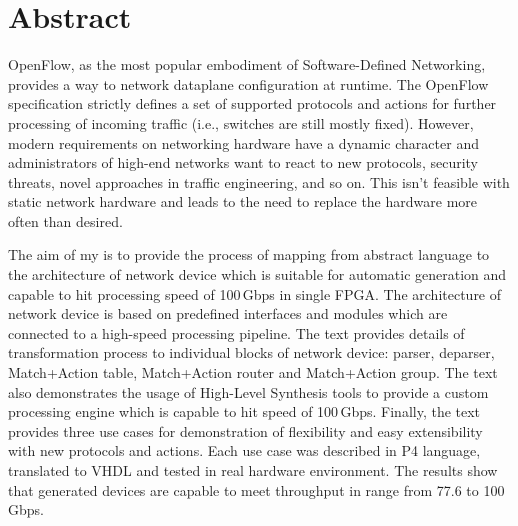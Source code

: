 \chapter{Abstract}

OpenFlow, as the most popular embodiment of Software-Defined Networking, provides a way
to network dataplane configuration at runtime. The OpenFlow specification strictly defines a set of supported protocols 
and actions for further processing of incoming traffic (i.e., switches are still mostly fixed). 
However, modern requirements on networking hardware have a dynamic
character and administrators of high-end networks want to react to new protocols, security threats,
novel approaches in traffic engineering, and so on. This isn't feasible with static network hardware and
leads to the need to replace the hardware more often than desired.

The aim of my \thesis{} is to provide the process of mapping from abstract language to the architecture of network device which is 
suitable for automatic generation and capable to hit processing speed of 100\,Gbps in single FPGA. 
The architecture of network device is based on predefined interfaces and modules which are connected to a high-speed processing pipeline.
The text provides details of transformation process to individual blocks of network 
device: parser, deparser, Match+Action table, Match+Action router and Match+Action group. 
The text also demonstrates the usage of High-Level Synthesis tools to provide a custom 
processing engine which is capable
to hit speed of 100\,Gbps. Finally, the text provides three use cases for demonstration of flexibility and easy extensibility
with new protocols and actions. Each use case was described in P4 language, translated to VHDL and tested in real hardware environment. 
The results show that generated devices are capable to meet throughput in range from 77.6 to 100\,Gbps.


